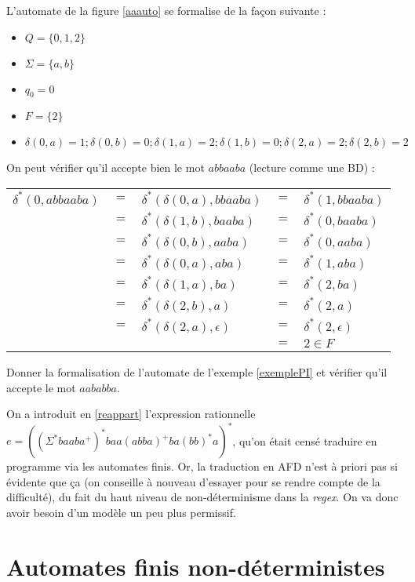 \begin{example}
L'automate de la figure \ref{aaauto} se formalise de la façon suivante :

\begin{itemize}
\item $Q = \{0,1,2\}$
\item $\Sigma = \{a,b\}$
\item $q_0 = 0$
\item $F = \{2\}$
\item $\delta(0,a) = 1; \delta(0,b) = 0; \delta(1,a) = 2; \delta(1,b) = 0; \delta(2,a) = 2; \delta(2,b) = 2$
\end{itemize}

On peut vérifier qu'il accepte bien le mot $abbaaba$ (lecture comme une BD) :

\begin{tabular}{lllll}
$\delta^*(0,abbaaba)$ &$=$& $\delta^*(\delta(0,a),bbaaba)$& $=$&$\delta^*(1,bbaaba)$ \\
&$=$& $\delta^*(\delta(1,b),baaba)$ &$=$& $\delta^*(0,baaba) $\\
&$=$& $\delta^*(\delta(0,b),aaba)$ &$=$& $\delta^*(0,aaba) $\\
&$=$& $\delta^*(\delta(0,a),aba)$ &$=$& $\delta^*(1,aba) $\\
&$=$& $\delta^*(\delta(1,a),ba)$ &$=$& $\delta^*(2,ba) $\\
&$=$& $\delta^*(\delta(2,b),a)$ &$=$& $\delta^*(2,a) $\\
&$=$& $\delta^*(\delta(2,a),\epsilon)$ &$=$& $\delta^*(2,\epsilon) $\\
&&&$=$&$2 \in F$
\end{tabular}


\end{example}

\begin{exercice}
Donner la formalisation de l'automate de l'exemple \ref{exemplePI} et vérifier qu'il accepte le mot $aababba$. 
\end{exercice}

On a introduit en \ref{reappart} l'expression rationnelle $e = ((\Sigma^*baaba^+)^*baa(abba)^+ba(bb)^*a)^*$, qu'on était censé traduire en programme via les automates finis. Or, la traduction en AFD n'est à priori pas si évidente que ça (on conseille à nouveau d'essayer pour se rendre compte de la difficulté), du fait du haut niveau de non-déterminisme dans la \textit{regex}. On va donc avoir besoin d'un modèle un peu plus permissif.

\section{Automates finis non-déterministes}
\label{NDFA}


